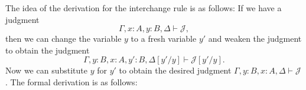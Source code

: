 The idea of the derivation for the interchange rule is as follows: If we have a judgment
\begin{equation*}
  \Gamma,x:A,y:B,\Delta\vdash\mathcal{J},
\end{equation*}
then we can change the variable $y$ to a fresh variable $y'$ and weaken the judgment to obtain the judgment
\begin{equation*}
  \Gamma,y:B,x:A,y':B,\Delta[y'/y]\vdash\mathcal{J}[y'/y].
\end{equation*}
Now we can substitute $y$ for $y'$ to obtain the desired judgment $\Gamma,y:B,x:A,\Delta\vdash\mathcal{J}$. The formal derivation is as follows:
\begin{prooftree}
\end{prooftree}

